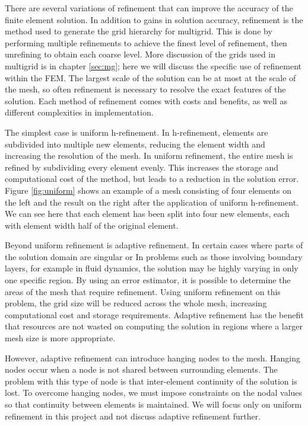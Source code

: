 \iffalse
How are the meshes created?
What is the process of refinement?
	Adaptive vs uniform
Hanging nodes..
p-refinement: order of the elements
h-refinement: density/size of the mesh
Use this to generate the grids for Multigrid
\fi

There are several variations of refinement that can improve the accuracy of the finite element solution.
In addition to gains in solution accuracy, refinement is the method used to generate the grid hierarchy for multigrid.
This is done by performing multiple refinements to achieve the finest level of refinement, then unrefining to obtain each coarse level.
More discussion of the grids used in multigrid is in chapter \ref{sec:mg}; here we will discuss the specific use of refinement within the FEM.
The largest scale of the solution can be at most at the scale of the mesh, so often refinement is necessary to resolve the exact features of the solution.
Each method of refinement comes with costs and benefits, as well as different complexities in implementation.

The simplest case is uniform h-refinement.
In h-refinement, elements are subdivided into multiple new elements, reducing the element width and increasing the resolution of the mesh.
In uniform refinement, the entire mesh is refined by subdividing every element evenly.
This increases the storage and computational cost of the method, but leads to a reduction in the solution error.
Figure \ref{fig:uniform} shows an example of a mesh consisting of four elements on the left and the result on the right after the application of uniform h-refinement.
We can see here that each element has been split into four new elements, each with element width half of the original element.

Beyond uniform refinement is adaptive refinement.
In certain cases where parts of the solution domain are singular or
In problems such as those involving boundary layers, for example in fluid dynamics, the solution may be highly varying in only one specific region.
By using an error estimator, it is possible to determine the areas of the mesh that require refinement.
Using uniform refinement on this problem, the grid size will be reduced across the whole mesh, increasing computational cost and storage requirements.
Adaptive refinement has the benefit that resources are not wasted on computing the solution in regions where a larger mesh size is more appropriate.

However, adaptive refinement can introduce hanging nodes to the mesh.
Hanging nodes occur when a node is not shared between surrounding elements.
The problem with this type of node is that inter-element continuity of the solution is lost.
To overcome hanging nodes, we must impose constraints on the nodal values so that continuity between elements is maintained.
We will focus only on uniform refinement in this project and not discuss adaptive refinement further.


